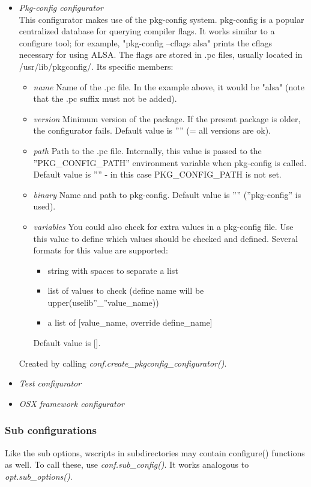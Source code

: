 \documentclass[a4paper,10pt]{article}
\begin{document}
\begin{itemize}
	\item \emph{Pkg-config configurator}\\
	This configurator makes use of the pkg-config system. pkg-config is a popular centralized database for querying compiler flags. It works similar to a configure tool; for example, "pkg-config --cflags alsa" prints the cflags necessary for using ALSA. The flags are stored in .pc files, usually located in /usr/lib/pkgconfig/.
	Its specific members:
	\begin{itemize}
		\item \emph{name} Name of the .pc file. In the example above, it would be "alsa" (note that the .pc suffix must not be added).
		\item \emph{version} Minimum version of the package. If the present package is older, the configurator fails. Default value is '''' (= all versions are ok).
		\item \emph{path} Path to the .pc file. Internally, this value is passed to the ''PKG\_CONFIG\_PATH'' environment variable when pkg-config is called. Default value is '''' - in this case PKG\_CONFIG\_PATH is not set.
		\item \emph{binary} Name and path to pkg-config. Default value is '''' (''pkg-config'' is used).
		\item \emph{variables} You could also check for extra values in a pkg-config file. Use this value to define which values should be checked and defined. Several formats for this value are supported:
		\begin{itemize}
			\item{string with spaces to separate a list}
			\item{list of values to check (define name will be upper(uselib''\_''value\_name))}
			\item{a list of [value\_name, override define\_name]}
		\end{itemize}
		Default value is [].
	\end{itemize}

	Created by calling \emph{conf.create\_pkgconfig\_configurator()}.

	\item \emph{Test configurator}\\

	\item \emph{OSX framework configurator}\\
\end{itemize}

\subsubsection{Sub configurations}
Like the sub options, wscripts in subdirectories may contain configure() functions as well. To call these, use \emph{conf.sub\_config()}. It works analogous to \emph{opt.sub\_options()}.
\end{document}
